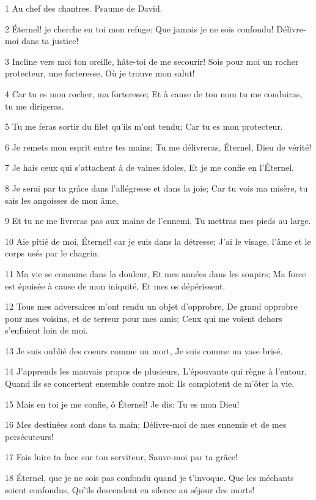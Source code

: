 \par 1 Au chef des chantres. Psaume de David.
\par 2 Éternel! je cherche en toi mon refuge: Que jamais je ne sois confondu! Délivre-moi dans ta justice!
\par 3 Incline vers moi ton oreille, hâte-toi de me secourir! Sois pour moi un rocher protecteur, une forteresse, Où je trouve mon salut!
\par 4 Car tu es mon rocher, ma forteresse; Et à cause de ton nom tu me conduiras, tu me dirigeras.
\par 5 Tu me feras sortir du filet qu'ils m'ont tendu; Car tu es mon protecteur.
\par 6 Je remets mon esprit entre tes mains; Tu me délivreras, Éternel, Dieu de vérité!
\par 7 Je hais ceux qui s'attachent à de vaines idoles, Et je me confie en l'Éternel.
\par 8 Je serai par ta grâce dans l'allégresse et dans la joie; Car tu vois ma misère, tu sais les angoisses de mon âme,
\par 9 Et tu ne me livreras pas aux mains de l'ennemi, Tu mettras mes pieds au large.
\par 10 Aie pitié de moi, Éternel! car je suis dans la détresse; J'ai le visage, l'âme et le corps usés par le chagrin.
\par 11 Ma vie se consume dans la douleur, Et mes années dans les soupirs; Ma force est épuisée à cause de mon iniquité, Et mes os dépérissent.
\par 12 Tous mes adversaires m'ont rendu un objet d'opprobre, De grand opprobre pour mes voisins, et de terreur pour mes amis; Ceux qui me voient dehors s'enfuient loin de moi.
\par 13 Je suis oublié des coeurs comme un mort, Je suis comme un vase brisé.
\par 14 J'apprends les mauvais propos de plusieurs, L'épouvante qui règne à l'entour, Quand ils se concertent ensemble contre moi: Ils complotent de m'ôter la vie.
\par 15 Mais en toi je me confie, ô Éternel! Je dis: Tu es mon Dieu!
\par 16 Mes destinées sont dans ta main; Délivre-moi de mes ennemis et de mes persécuteurs!
\par 17 Fais luire ta face sur ton serviteur, Sauve-moi par ta grâce!
\par 18 Éternel, que je ne sois pas confondu quand je t'invoque. Que les méchants soient confondus, Qu'ils descendent en silence au séjour des morts!

